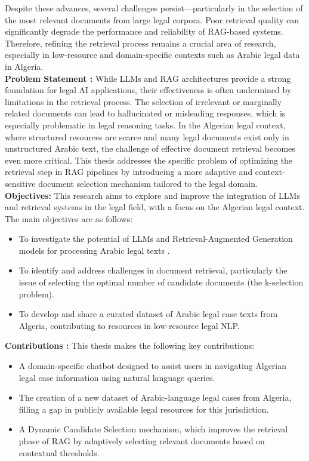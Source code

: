 Despite these advances, several challenges persist—particularly in the selection of the most relevant documents from large legal corpora. Poor retrieval quality can significantly degrade the performance and reliability of RAG-based systems. Therefore, refining the retrieval process remains a crucial area of research, especially in low-resource and domain-specific contexts such as Arabic legal data in Algeria.\\
\textbf{Problem Statement :} 
While LLMs and RAG architectures provide a strong foundation for legal AI applications, their effectiveness is often undermined by limitations in the retrieval process. The selection of irrelevant or marginally related documents can lead to hallucinated or misleading responses, which is especially problematic in legal reasoning tasks. In the Algerian legal context, where structured resources are scarce and many legal documents exist only in unstructured Arabic text, the challenge of effective document retrieval becomes even more critical. This thesis addresses the specific problem of optimizing the retrieval step in RAG pipelines by introducing a more adaptive and context-sensitive document selection mechanism tailored to the legal domain.\\
\textbf{Objectives:} 
This research aims to explore and improve the integration of LLMs and retrieval systems in the legal field, with a focus on the Algerian legal context. The main objectives are as follows:
\begin{itemize}
	\item To investigate the potential of LLMs and Retrieval-Augmented Generation models for processing Arabic legal texts .
	\item To identify and address challenges in document retrieval, particularly the issue of selecting the optimal number of candidate documents (the k-selection problem).
	\item To develop and share a curated dataset of Arabic legal case texts from Algeria, contributing to resources in low-resource legal NLP.
\end{itemize}
\textbf{Contributions :} This thesis makes the following key contributions:
\begin{itemize}
	\item A domain-specific chatbot designed to assist users in navigating Algerian legal case information using natural language queries.
	\item The creation of a new dataset of Arabic-language  legal cases from Algeria, filling a gap in publicly available legal resources for this jurisdiction.
	\item A Dynamic Candidate Selection mechanism, which improves the retrieval phase of RAG by adaptively selecting relevant documents based on contextual thresholds.
\end{itemize}
